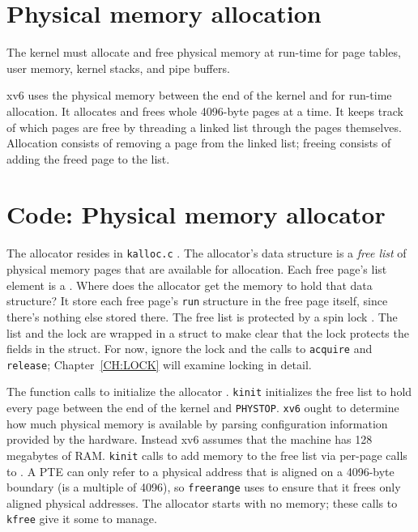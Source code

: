 \section{Physical memory allocation}

The kernel must allocate and free physical memory at run-time for
page tables,
user memory,
kernel stacks,
and pipe buffers.

xv6 uses the physical memory between the end of the kernel and
for run-time allocation. It allocates and frees whole 4096-byte pages
at a time. It keeps track of which pages are free by threading a
linked list through the pages themselves. Allocation consists of
removing a page from the linked list; freeing consists of adding the
freed page to the list.
\section{Code: Physical memory allocator}

The allocator resides in {\tt kalloc.c} .
The allocator's data structure is a
\textit{free list}
of physical memory pages that are available
for allocation.
Each free page's list element is a
.
Where does the allocator get the memory
to hold that data structure?
It store each free page's
\lstinline{run}
structure in the free page itself,
since there's nothing else stored there.
The free list is
protected by a spin lock
.
The list and the lock are wrapped in a struct
to make clear that the lock protects the fields
in the struct.
For now, ignore the lock and the calls to
\lstinline{acquire}
and
\lstinline{release};
Chapter~\ref{CH:LOCK} will examine
locking in detail.

The function
calls
to initialize the allocator
.
\lstinline{kinit}
initializes the free list to hold
every page between the end of the kernel and {\tt PHYSTOP}.
\lstinline{xv6}
ought to determine how much physical
memory is available by parsing configuration information 
provided by the hardware.
Instead xv6 assumes that the machine has
128 megabytes of RAM.
\lstinline{kinit}
calls
to add memory to the free list via per-page calls to
.
A PTE can only refer to a physical address that is aligned
on a 4096-byte boundary (is a multiple of 4096), so
\lstinline{freerange}
uses
to ensure that it frees only aligned physical addresses.
The allocator starts with no memory;
these calls to
\lstinline{kfree}
give it some to manage.

